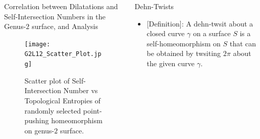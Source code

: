 \documentclass[leqno,presentation]{beamer}
\begin{document}
\begin{frame}
\begin{columns}[t]
\begin{column}{.45\linewidth}
\begin{block}{Correlation between Dilatations and Self-Intersection Numbers in the Genus-$2$ surface, and Analysis }
\vspace{1ex}
\begin{figure}
	\texttt{[image: G2L12\_Scatter\_Plot.jpg]}
	\caption{Scatter plot of Self-Intersection Number vs Topological Entropies of randomly selected point-pushing homeomorphism on genus-$2$ surface.}
\end{figure}
\end{block}

\end{column}




\begin{column}{.25\linewidth}

\begin{block}{Dehn-Twists}
	\vspace{1ex}
	\begin{itemize}
		\item {[Definition]}: A dehn-twsit about a closed curve $\gamma$ on a surface $S$ is a self-homeomorphism on $S$ that can be obtained by twsiting $2\pi$ about the given curve $\gamma$.


\end{itemize}
\end{block}
\end{column}
\end{columns}
\end{frame}
\end{document}
